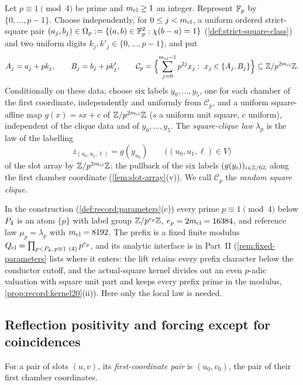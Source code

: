 \begin{definition}\label{def:clique-law}
Let $p\equiv1\pmod4$ be prime and $m_{\mathrm{cl}}\ge1$ an integer. Represent $\mathbb F_p$ by
$\{0,\dots,p-1\}$. Choose independently, for $0\le j<m_{\mathrm{cl}}$, a uniform ordered
strict-square pair
$(a_j,b_j)\in\Omega_{p}:=\{(a,b)\in\mathbb F_p^2:\chi(b-a)=1\}$
(\cref{def:strict-square-class}) and two uniform digits
$k_j,k'_j\in\{0,\dots,p-1\}$, and put
\[
 A_j=a_j+pk_j,\qquad B_j=b_j+pk'_j,\qquad
 \mathcal C_p=\Bigl\{\sum_{j=0}^{\mcl-1}p^{2j}x_j:\ x_j\in\{A_j,B_j\}\Bigr\}
 \subseteq\Z/p^{2\mcl}\Z .
\]
Conditionally on these data, choose six labels $y_0,\dots,y_5$, one for each
chamber of the first coordinate, independently and uniformly from
$\mathcal C_p$, and a uniform square-affine map $g(x)=sx+c$ of
$\mathbb Z/p^{2m_{\mathrm{cl}}}\mathbb Z$ ($s$ a uniform unit square, $c$ uniform), independent of
the clique data and of $y_0,\dots,y_5$. The
\emph{square-clique law} $\lambda_p$ is the law of the labelling
\[
 z_{(u_0,u_1,\ell)}=g(y_{u_0})\qquad\bigl((u_0,u_1,\ell)\in V\bigr)
\]
of the slot array by $\mathbb Z/p^{2m_{\mathrm{cl}}}\mathbb Z$: the pullback of the six labels
$(g(y_i))_{i\in\mathbb Z/6\mathbb Z}$ along the first chamber coordinate
(\cref{lem:slot-array}(v)). We call $\mathcal C_p$ the \emph{random square
clique}.
\end{definition}

In the construction (\cref{def:record:parameters}(c)) every prime
$p\equiv1\pmod4$ below $P_4$ is an atom $\{p\}$ with label group
$\mathbb Z/p^{e_p}\mathbb Z$, $e_p=2m_{\mathrm{cl}}=16384$, and reference law $\mu_p=\lambda_p$ with
$m_{\mathrm{cl}}=8192$. The prefix is a fixed finite modulus
$Q_{\rm cl}=\prod_{p<P_4,\,p\equiv1\ (4)}p^{e_p}$, and its analytic interface is in Part~II
(\cref{rem:fixed-parameters} lists where it enters: the lift retains every
prefix character below the conductor cutoff, and the actual-square kernel
divides out an even $p$-adic valuation with square unit part and keeps
every prefix prime in the modulus,
\cref{prop:record:kernel20}(ii)). Here only the local law is needed.

\subsection{Reflection positivity and forcing except for coincidences}\label{subsec:clique-local}

For a pair of slots $(u,v)$, its \emph{first-coordinate pair} is
$(u_0,v_0)$, the pair of their first chamber coordinates.

